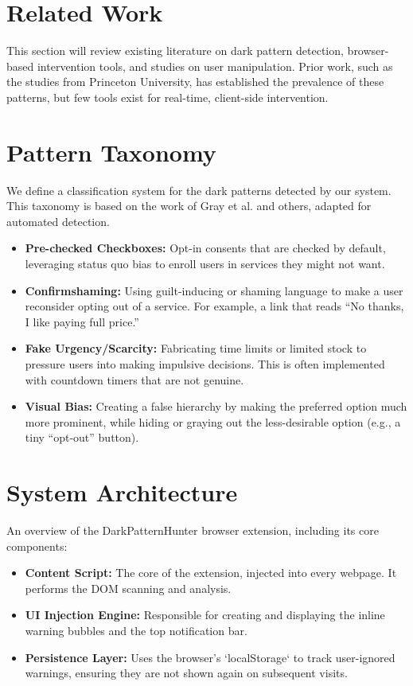 \documentclass[journal]{IEEEtran}
\begin{document}
\section{Related Work}
This section will review existing literature on dark pattern detection, browser-based intervention tools, and studies on user manipulation. Prior work, such as the studies from Princeton University, has established the prevalence of these patterns, but few tools exist for real-time, client-side intervention.

\section{Pattern Taxonomy}
We define a classification system for the dark patterns detected by our system. This taxonomy is based on the work of Gray et al. and others, adapted for automated detection.
\begin{itemize}
    \item \textbf{Pre-checked Checkboxes:} Opt-in consents that are checked by default, leveraging status quo bias to enroll users in services they might not want.
    \item \textbf{Confirmshaming:} Using guilt-inducing or shaming language to make a user reconsider opting out of a service. For example, a link that reads ``No thanks, I like paying full price.''
    \item \textbf{Fake Urgency/Scarcity:} Fabricating time limits or limited stock to pressure users into making impulsive decisions. This is often implemented with countdown timers that are not genuine.
    \item \textbf{Visual Bias:} Creating a false hierarchy by making the preferred option much more prominent, while hiding or graying out the less-desirable option (e.g., a tiny ``opt-out'' button).
\end{itemize}

\section{System Architecture}
An overview of the DarkPatternHunter browser extension, including its core components:
\begin{itemize}
    \item \textbf{Content Script:} The core of the extension, injected into every webpage. It performs the DOM scanning and analysis.
    \item \textbf{UI Injection Engine:} Responsible for creating and displaying the inline warning bubbles and the top notification bar.
    \item \textbf{Persistence Layer:} Uses the browser's `localStorage` to track user-ignored warnings, ensuring they are not shown again on subsequent visits.
\end{itemize}
\end{document}

